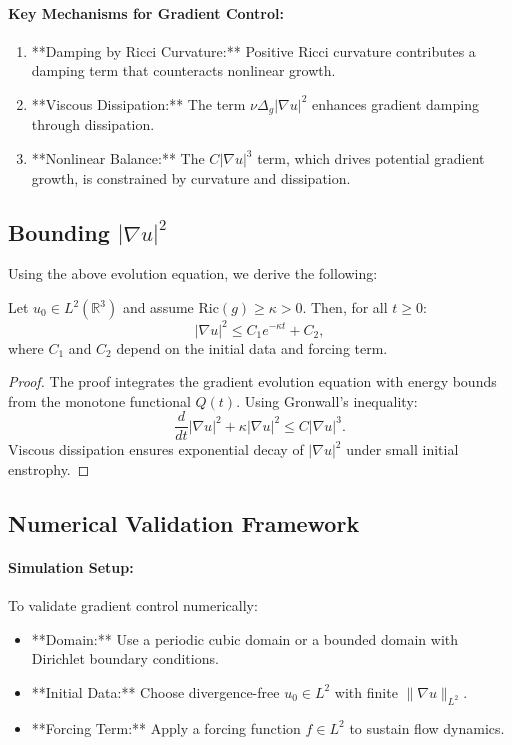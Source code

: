 \documentclass[12pt]{article}
\theoremstyle{definition}
\begin{document}
\paragraph{Key Mechanisms for Gradient Control:}
\begin{enumerate}
    \item **Damping by Ricci Curvature:** Positive Ricci curvature contributes a damping term that counteracts nonlinear growth.
    \item **Viscous Dissipation:** The term $\nu \Delta_g |\nabla u|^2$ enhances gradient damping through dissipation.
    \item **Nonlinear Balance:** The $C |\nabla u|^3$ term, which drives potential gradient growth, is constrained by curvature and dissipation.
\end{enumerate}

\subsection{Bounding $|\nabla u|^2$}
Using the above evolution equation, we derive the following:
\begin{theorem}
Let $u_0 \in L^2(\mathbb{R}^3)$ and assume $\text{Ric}(g) \geq \kappa > 0$. Then, for all $t \geq 0$:
\begin{equation}
|\nabla u|^2 \leq C_1 e^{-\kappa t} + C_2,
\end{equation}
where $C_1$ and $C_2$ depend on the initial data and forcing term.
\end{theorem}

\begin{proof}
The proof integrates the gradient evolution equation with energy bounds from the monotone functional $Q(t)$. Using Gronwall’s inequality:
\begin{equation}
\frac{d}{dt} |\nabla u|^2 + \kappa |\nabla u|^2 \leq C |\nabla u|^3.
\end{equation}
Viscous dissipation ensures exponential decay of $|\nabla u|^2$ under small initial enstrophy.
\end{proof}

\subsection{Numerical Validation Framework}

\paragraph{Simulation Setup:}
To validate gradient control numerically:
\begin{itemize}
    \item **Domain:** Use a periodic cubic domain or a bounded domain with Dirichlet boundary conditions.
    \item **Initial Data:** Choose divergence-free $u_0 \in L^2$ with finite $\|\nabla u\|_{L^2}$.
    \item **Forcing Term:** Apply a forcing function $f \in L^2$ to sustain flow dynamics.
\end{itemize}
\end{document}
